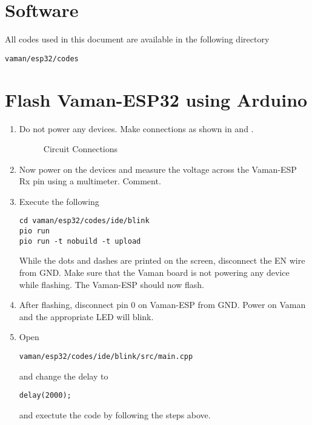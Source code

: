 \documentclass[12pt]{article}
\begin{document}
\fi

\section{Software}
%
All codes used in this document are available in the following directory 
\begin{lstlisting}
vaman/esp32/codes
\end{lstlisting}
\section{Flash Vaman-ESP32 using Arduino}

\renewcommand{\theequation}{\theenumi}
\renewcommand{\thefigure}{\theenumi}
\begin{enumerate}[label=\thesection.\arabic*.,ref=\thesection.\theenumi]
\item Do not power any devices.  Make connections as shown in  and 
.
			\begin{table}[!h]
		
		\caption{}
		\label{tab:vaman/uart/rpi-vaman-uart}
	\end{table}
\begin{figure}
\centering

\caption{Circuit Connections}
\label{fig:vaman/uart/1}
\end{figure}
\item Now power on the devices and measure the voltage across the Vaman-ESP Rx pin using a multimeter.  Comment.
\iffalse
\item Modify your platformio.ini file by adding the lines
\begin{lstlisting}
upload_protocol = esptool
upload_port = /dev/ttyACM0
upload_speed = 115200
\end{lstlisting}
\fi
\item Execute the following
\begin{lstlisting}
cd vaman/esp32/codes/ide/blink
pio run 
pio run -t nobuild -t upload
\end{lstlisting}
While the dots and dashes are printed on the screen, disconnect the EN wire from GND.   Make sure that the Vaman board is not powering any device while flashing.  The Vaman-ESP should now flash.
\item After flashing, disconnect pin 0 on Vaman-ESP from GND. Power on Vaman and the appropriate LED will blink.
\item Open
\begin{lstlisting}
vaman/esp32/codes/ide/blink/src/main.cpp 
\end{lstlisting}
and change the delay to 
\begin{lstlisting}
delay(2000);
\end{lstlisting}
and exectute the code by following the steps above.
\end{enumerate}
\end{document}
